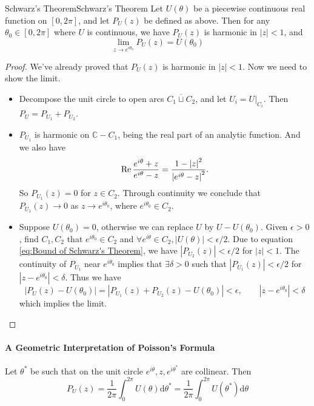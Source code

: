 \documentclass[../main.tex]{subfiles}
\begin{document}
\begin{theorem}{Schwarz's Theorem}{Schwarz's Theorem}
	Let $U(\theta)$ be a piecewise continuous real function on $[0,2 \pi]$, and let $P_U(z)$ be defined as above. Then for any $\theta_0 \in [0,2 \pi]$ where $U$ is continuous, we have $P_U(z)$ is harmonic in $\left|z\right|<1$, and
	\begin{equation}
		\lim_{z \to e^{i \theta_0}} P_U(z) = U(\theta_0)
	\end{equation}
\end{theorem}
\begin{proof}
We've already proved that $P_U(z)$ is harmonic in $\left|z\right|<1$. Now we need to show the limit.

\begin{itemize}
	\item Decompose the unit circle to open arcs $\overline{C_1\sqcup C_2}$, and let $U_i = U|_{C_i}$. Then $P_U = P_{U_1} + P_{U_2}$.
	\item $P_{U_1}$ is harmonic on $\mathbb{C}-C_1$, being the real part of an analytic function. And we also have
		\begin{equation*}
			\operatorname{Re} \frac{e^{i \theta}+z}{e^{i \theta}-z} = \frac{1-\left|z\right|^2}{\left|e^{i \theta}-z\right|^2}.
		\end{equation*}
		So $P_{U_1}(z)=0$ for $z\in C_2$. Through continuity we conclude that $P_{U_1}(z) \to 0$ as $z \to e^{i \theta_0}$, where $e^{i \theta_0} \in C_2$.
	\item Suppose $U(\theta_0)=0$, otherwise we can replace $U$ by $U-U(\theta_0)$. Given $\epsilon>0$, find $C_1,C_2$ that $e^{i \theta_0}\in C_2$ and $\forall e^{i \theta}\in C_2, \left|U(\theta)\right| < \epsilon / 2$. Due to equation \ref{eq:Bound of Schwarz's Theorem}, we have $\left|P_{U_2}(z)\right|< \epsilon / 2$ for $\left|z\right|<1$. The continuity of $P_{U_1}$ near $e^{i \theta_0}$ implies that $\exists \delta>0$ such that $\left|P_{U_1}(z)\right|<\epsilon / 2$ for $\left|z-e^{i \theta_0}\right|<\delta$. Thus we have
		\begin{equation*}
			\left|P_U(z) - U(\theta_0)\right| = \left|P_{U_1}(z) + P_{U_2}(z) - U(\theta_0)\right| < \epsilon, \qquad \left|z-e^{i \theta_0}\right|<\delta
		\end{equation*}
		which implies the limit.
\end{itemize}
\end{proof}

\paragraph{A Geometric Interpretation of Poisson's Formula}
Let $\theta^*$ be such that on the unit circle $e^{i \theta},z,e^{i \theta^*}$ are collinear. Then
\begin{equation}
	P_U(z) = \frac{1}{2 \pi} \int_0^{2 \pi} U(\theta) \mathrm{d} \theta^* = \frac{1}{2 \pi} \int_0^{2 \pi} U(\theta^*) \mathrm{d} \theta
\end{equation}
\end{document}
